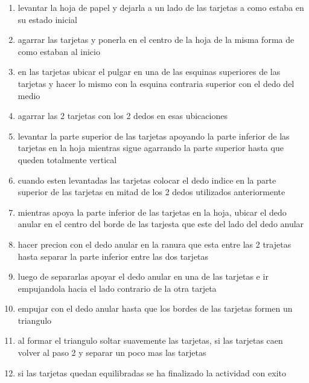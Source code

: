 \documentclass{article}
\begin{document}
\begin{enumerate}
    \vspace{0.8cm}
    \item levantar la hoja de papel y dejarla a un lado de las tarjetas a como estaba en su estado inicial
    \item agarrar las tarjetas y ponerla en el centro de la hoja de la misma forma de como estaban al inicio
    \item en las tarjetas ubicar el pulgar en una de las esquinas superiores de las tarjetas  y hacer lo mismo con la esquina contraria superior con el dedo del medio 
    \item agarrar las 2 tarjetas con los 2 dedos en esas ubicaciones
    \item levantar la parte superior de las tarjetas apoyando la parte inferior de las tarjetas en la hoja mientras sigue agarrando la parte superior hasta que queden totalmente vertical
    \item cuando esten levantadas las tarjetas colocar el dedo indice en la parte superior de las tarjetas en mitad de los 2 dedos utilizados anteriormente
    \item mientras apoya la parte inferior de las tarjetas en la hoja, ubicar el dedo anular en el centro del borde de las tarjesta que este del lado del dedo anular
    \item hacer precion con el dedo anular en la ranura  que esta entre las 2 trajetas hasta separar la parte inferior entre las dos tarjetas 
    \item luego de separarlas apoyar el dedo anular en una de las tarjetas e ir empujandola hacia el lado contrario de la otra tarjeta 
    \item empujar con el dedo anular hasta que los bordes de las tarjetas formen un triangulo 
    \item al formar el triangulo soltar suavemente las tarjetas, si las tarjetas caen volver al paso 2 y separar un poco mas las tarjetas
    \item si las tarjetas quedan equilibradas se ha finalizado la actividad con exito
\end{enumerate}
\end{document}
